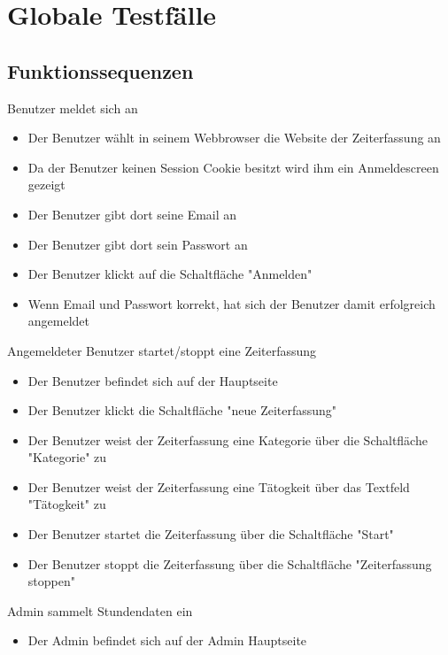 \section{Globale Testfälle}

\subsection{Funktionssequenzen}
\begin{requirements}
\item Benutzer meldet sich an
	\begin{itemize}
  			\item Der Benutzer wählt in seinem Webbrowser die Website der Zeiterfassung an
  			\item Da der Benutzer keinen Session Cookie besitzt wird ihm ein Anmeldescreen gezeigt
  			\item Der Benutzer gibt dort seine Email an
  			\item Der Benutzer gibt dort sein Passwort an
  			\item Der Benutzer klickt auf die Schaltfläche "Anmelden"
  			\item Wenn Email und Passwort korrekt, hat sich der Benutzer damit erfolgreich angemeldet
	\end{itemize}
\item  Angemeldeter Benutzer startet/stoppt eine Zeiterfassung
	\begin{itemize}
		\item Der Benutzer befindet sich auf der Hauptseite
		\item Der Benutzer klickt die Schaltfläche "neue Zeiterfassung"
		\item Der Benutzer weist der Zeiterfassung eine Kategorie über die Schaltfläche "Kategorie" zu
		\item Der Benutzer weist der Zeiterfassung eine Tätogkeit über das Textfeld "Tätogkeit" zu
		\item Der Benutzer startet die Zeiterfassung über die Schaltfläche "Start"
		\item Der Benutzer stoppt die Zeiterfassung über die Schaltfläche "Zeiterfassung stoppen"
	\end {itemize}
\item Admin sammelt Stundendaten ein
	\begin{itemize}
		\item Der Admin befindet sich auf der Admin Hauptseite

\end{itemize}
\end{requirements}
